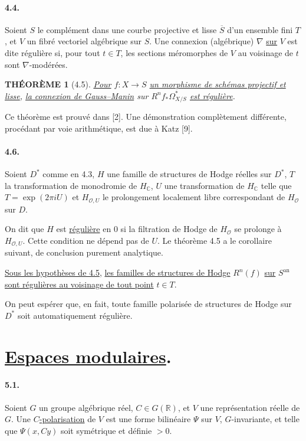 \documentclass[10pt,leqno]{article}
\newcommand{\C}{\mathbb C}
\newcommand{\R}{\mathbb R}
\newcommand{\cO}{\mathcal O}
\theoremstyle{deligne}
\newtheorem*{theoreme}{THÉORÈME}
\renewcommand{\underline}[1]{\uline{#1}}
\begin{document}
\paragraph{4.4.}
Soient $S$ le complément dans une courbe projective et lisse $\overline S$ d'un ensemble fini $T$, et $V$ un fibré vectoriel algébrique sur $S$. Une connexion (algébrique) $\nabla$ \underline{sur} $V$ est dite régulière si, pour tout $t\in T$, les sections méromorphes de $V$ au voisinage de $t$ sont $\nabla$-modérées.

\begin{theoreme}[4.5]
\underline{Pour} $f:X\to S$ \underline{un morphisme de schémas projectif et lisse}, \underline{la connexion de Gauss--Manin} sur $R^n f_*\Omega^*_{X/S}$ \underline{est régulière}.
\end{theoreme}

Ce théorème est prouvé dans [2]. Une démonstration complètement différente, procédant par voie arithmétique, est due à Katz [9].

\paragraph{4.6.}
Soient $D^*$ comme en 4.3, $H$ une famille de structures de Hodge réelles sur $D^*$, $T$ la transformation de monodromie de $H_\C$, $U$ une transformation de $H_\C$ telle que $T=\exp(2\pi iU)$ et $H_{\cO,U}$ le prolongement localement libre correspondant de $H_\cO$ sur $D$.

On dit que $H$ est \underline{régulière} en $0$ si la filtration de Hodge de $H_\cO$ se prolonge à $H_{\cO,U}$. Cette condition ne dépend pas de $U$. Le théorème 4.5 a le corollaire suivant, de conclusion purement analytique.

\begin{corollaire}[4.7]
\underline{Sous les hypothèses de 4.5}, \underline{les familles de structures de Hodge} $R^n(f)$ \underline{sur} $S^{\mathrm{an}}$ \underline{sont régulières au voisinage de tout point} $t\in T$.
\end{corollaire}

On peut espérer que, en fait, toute famille polarisée de structures de Hodge sur $D^*$ soit automatiquement régulière.

\section{\underline{Espaces modulaires}.}

\paragraph{5.1.}
Soient $G$ un groupe algébrique réel, $C\in G(\R)$, et $V$ une représentation réelle de $G$. Une $C$\underline{-polarisation} de $V$ est une forme bilinéaire $\Psi$ sur $V$, $G$-invariante, et telle que $\Psi(x,Cy)$ soit symétrique et définie $>0$.
\end{document}
